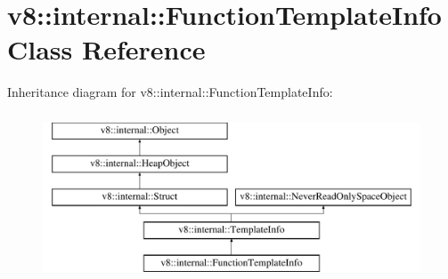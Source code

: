 \hypertarget{classv8_1_1internal_1_1FunctionTemplateInfo}{}\section{v8\+:\+:internal\+:\+:Function\+Template\+Info Class Reference}
\label{classv8_1_1internal_1_1FunctionTemplateInfo}
Inheritance diagram for v8\+:\+:internal\+:\+:Function\+Template\+Info\+:\begin{figure}[H]
\begin{center}
\leavevmode
\includegraphics[height=5.000000cm]{classv8_1_1internal_1_1FunctionTemplateInfo}
\end{center}
\end{figure}
